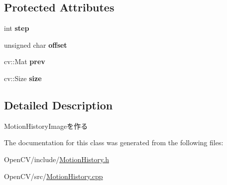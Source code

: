 \subsection*{Protected Attributes}
\begin{DoxyCompactItemize}
\item 
\hypertarget{classskl_1_1_motion_history_a81237db3cea6a809e9c1f2a64d43f900}{}\label{classskl_1_1_motion_history_a81237db3cea6a809e9c1f2a64d43f900} 
int {\bfseries step}
\item 
\hypertarget{classskl_1_1_motion_history_a08d378704fe9fe7e2791519e36ea82b7}{}\label{classskl_1_1_motion_history_a08d378704fe9fe7e2791519e36ea82b7} 
unsigned char {\bfseries offset}
\item 
\hypertarget{classskl_1_1_motion_history_a824a5cdfecf636cc6a7ff8ef53142575}{}\label{classskl_1_1_motion_history_a824a5cdfecf636cc6a7ff8ef53142575} 
cv\+::\+Mat {\bfseries prev}
\item 
\hypertarget{classskl_1_1_motion_history_a74ca6f44b70d17ee8548e263b366e463}{}\label{classskl_1_1_motion_history_a74ca6f44b70d17ee8548e263b366e463} 
cv\+::\+Size {\bfseries size}
\end{DoxyCompactItemize}


\subsection{Detailed Description}
Motion\+History\+Imageを作る 

The documentation for this class was generated from the following files\+:\begin{DoxyCompactItemize}
\item 
Open\+C\+V/include/\hyperlink{_motion_history_8h}{Motion\+History.\+h}\item 
Open\+C\+V/src/\hyperlink{_motion_history_8cpp}{Motion\+History.\+cpp}\end{DoxyCompactItemize}
